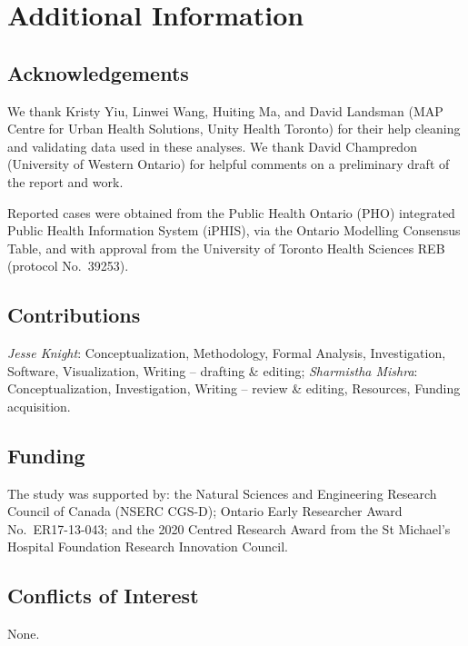 \section*{Additional Information}
\subsection*{Acknowledgements}
We thank Kristy Yiu, Linwei Wang, Huiting Ma, and David Landsman
(MAP Centre for Urban Health Solutions, Unity Health Toronto)
for their help cleaning and validating \covid data used in these analyses.
We thank David Champredon (University of Western Ontario)
for helpful comments on a preliminary draft of the report and work.
\par
Reported \covid cases were obtained
from the Public Health Ontario (PHO) integrated Public Health Information System (iPHIS),
via the Ontario \covid Modelling Consensus Table,
and with approval from the University of Toronto Health Sciences REB (protocol No.\ 39253).
\subsection*{Contributions}
\emph{Jesse Knight}:
  Conceptualization,
  Methodology,
  Formal Analysis,
  Investigation,
  Software,
  Visualization,
  Writing -- drafting \& editing;
\emph{Sharmistha Mishra}:
  Conceptualization,
  Investigation,
  Writing -- review \& editing,
  Resources,
  Funding acquisition.
\subsection*{Funding}
The study was supported by:
the Natural Sciences and Engineering Research Council of Canada (NSERC CGS-D);
Ontario Early Researcher Award No.\ ER17-13-043; and
the 2020 \covid Centred Research Award from the St Michael's Hospital Foundation Research Innovation Council.
\subsection*{Conflicts of Interest}
None.
